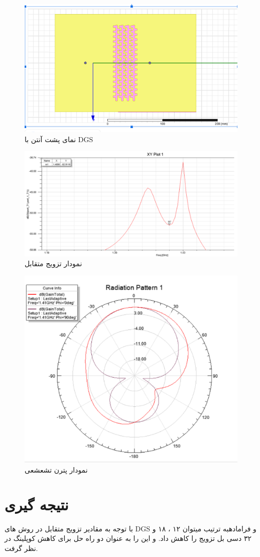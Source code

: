 \begin{figure}
	\centering
	\includegraphics[scale=0.5]{Images/fig43.png}
	\caption{نمای پشت آنتن با DGS}
	\label{fig43}
\end{figure}

\begin{figure}
	\centering
	\includegraphics[scale=0.3]{Images/fig44.png}
	\caption{نمودار تزویج متقابل}
	\label{fig44}
\end{figure}

\begin{figure}
	\centering
	\includegraphics[scale=0.5]{Images/fig45.png}
	\caption{نمودار پترن تشعشعی}
	\label{fig45}
\end{figure}

\section{نتیجه گیری}
با توجه به مقادیر تزویج متقابل در روش های DGS و فرامادهبه ترتیب میتوان ۱۲ ، ۱۸ و ۳۲ دسی بل تزویج را کاهش داد. و این را به عنوان دو راه حل برای کاهش کوپلینگ در نظر گرفت.
